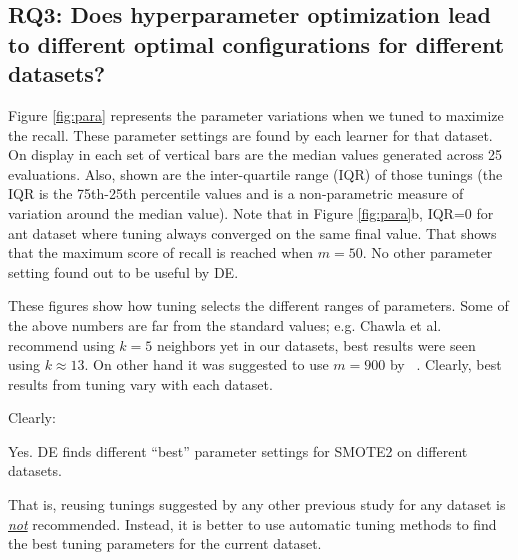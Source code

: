 \subsection{\textbf{RQ3: Does hyperparameter optimization lead to different optimal configurations for different datasets?}}

Figure \ref{fig:para} represents the parameter variations when we tuned to maximize the recall. These parameter settings are found by each learner for that dataset.
On display in each set of vertical bars are
the median values generated across 25 evaluations.
Also, shown are
the inter-quartile range (IQR) of those tunings (the IQR is the 75th-25th percentile values and is a non-parametric measure of variation
around the median value). Note that in Figure \ref{fig:para}b, IQR=0 for  ant dataset where tuning always converged on the same final value. That shows that the maximum score of recall is reached when $m=50$. No other parameter setting found out to be useful by DE.

  These figures
show how tuning selects the different ranges  of
parameters.
Some of the above numbers are far from the standard values; e.g. Chawla et al.~\cite{chawla2002smote} recommend using $k=5$ neighbors yet in our datasets, best results were seen using $k \approx 13$. On other hand it was suggested to use $m=900$ by ~\cite{pears2014synthetic}.
Clearly,
best results from tuning
vary with each dataset.

Clearly:
\begin{lesson1}
    Yes. DE finds different ``best'' parameter settings for SMOTE2 on different datasets.
\end{lesson1}
 That is,  reusing tunings  suggested  by  any other  previous study  for any dataset is \underline{{\em not}} recommended. Instead,  it is better to
      use  automatic  tuning  methods  to find the best tuning parameters for the current dataset.
      
